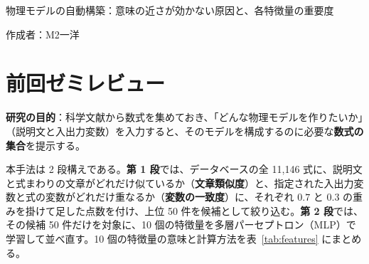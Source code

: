\documentclass[a4j,dvipdfmx,11pt]{jresume}
\begin{document}

\medskip
\begin{center}
  {\Large 物理モデルの自動構築：意味の近さが効かない原因と、各特徴量の重要度}
\end{center}

\begin{flushright}
作成者：M2\quad 一洋
\end{flushright}
\medskip

\section{前回ゼミレビュー}
\textbf{研究の目的}：科学文献から数式を集めておき、「どんな物理モデルを作りたいか」（説明文と入出力変数）を入力すると、そのモデルを構成するのに必要な\textbf{数式の集合}を提示する。

本手法は 2 段構えである。\textbf{第 1 段}では、データベースの全 11{,}146 式に、説明文と式まわりの文章がどれだけ似ているか（\textbf{文章類似度}）と、指定された入出力変数と式の変数がどれだけ重なるか（\textbf{変数の一致度}）に、それぞれ $0.7$ と $0.3$ の重みを掛けて足した点数を付け、上位 50 件を候補として絞り込む。\textbf{第 2 段}では、その候補 50 件だけを対象に、10 個の特徴量を多層パーセプトロン（MLP）で学習して並べ直す。10 個の特徴量の意味と計算方法を表~\ref{tab:features} にまとめる。
\end{document}
